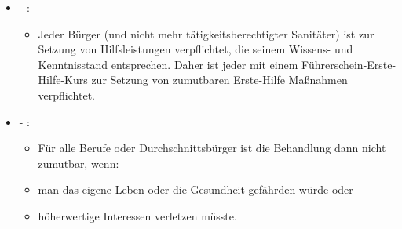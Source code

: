 \begin{itemize}
       \begin{itemize}
           
           \item {\mdseries
           Jeder tätigkeits- oder berufsberechtigter Sanitäter, unabhängig
           von seinem Kompetenzstand, ist zur selbstständigen und
           eigenverantwortlichen Versorgung einer hilfsbed\"urftigen Person
           verpflichtet. Dabei muss er, auch au{\ss}erhalb des Dienstes, zumindest
           qualifizierte Erste Hilfe leisten und wenn n\"otig einen Arzt (jeder
           mit jus practicandi) nachfordern.}
           
       \end{itemize}
       
       \item {\mdseries
        - :}
       
       \begin{itemize}
           
           \item {\mdseries
           Jeder B\"urger (und nicht mehr tätigkeitsberechtigter Sanitäter) ist
           zur Setzung von Hilfsleistungen verpflichtet, die seinem Wissens- und
           Kenntnisstand entsprechen. Daher ist jeder mit einem
           F\"uhrerschein-Erste-Hilfe-Kurs zur Setzung von zumutbaren Erste-Hilfe
           Ma{\ss}nahmen verpflichtet.}
           
       \end{itemize}
       
       \item {\mdseries
        -
       :}
       
       \begin{itemize}
           
           \item {\mdseries
           F\"ur alle Berufe oder Durchschnittsb\"urger ist die Behandlung dann
           nicht zumutbar, wenn:}
           
       \end{itemize}
       
       \begin{itemize}
           \item {\mdseries
           man das eigene Leben oder die Gesundheit gefährden w\"urde oder}
           
           \item {\mdseries
           h\"oherwertige Interessen verletzen m\"usste.}
           
       \end{itemize}
       
\end{itemize}


